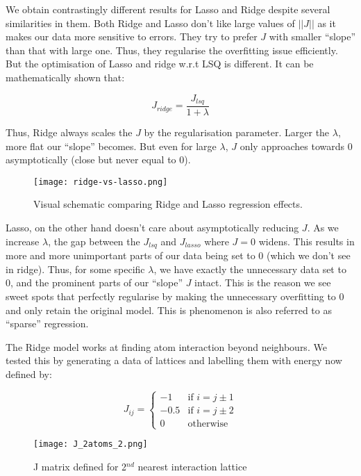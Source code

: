 We obtain contrastingly different results for Lasso and Ridge despite several similarities in them.
Both Ridge and Lasso don't like large values of \(||J||\) as it makes our data more sensitive to errors. They try to prefer $J$ with smaller ``slope'' than that with large one.
Thus, they regularise the overfitting issue efficiently.
But the optimisation of Lasso and ridge w.r.t LSQ is different.
It can be mathematically shown that:

\[J_{ridge}=\frac{J_{lsq}}{1+\lambda}\]

Thus, Ridge always scales the $J$ by the regularisation parameter.
Larger the \(\lambda\), more flat our ``slope'' becomes.
But even for large \(\lambda\), $J$ only approaches towards 0 asymptotically (close but never equal to 0).

\begin{figure}[H]
    \centering
    \texttt{[image: ridge-vs-lasso.png]}
    \caption{Visual schematic comparing Ridge and Lasso regression effects.}
\end{figure}

Lasso, on the other hand doesn't care about asymptotically reducing $J$.
As we increase \(\lambda\), the gap between the \(J_{lsq}\) and \(J_{lasso}\) where $J=0$ widens.
This results in more and more unimportant parts of our data being set to 0 (which we don't see in ridge).
Thus, for some specific \(\lambda\), we have exactly the unnecessary data set to 0, and the prominent parts of our ``slope'' $J$ intact.
This is the reason we see sweet spots that perfectly regularise by making the unnecessary overfitting to 0 and only retain the original model.
This is phenomenon is also referred to as ``sparse'' regression.

The Ridge model works at finding atom interaction beyond neighbours. We tested this by generating a data of lattices and labelling them with energy now defined by:

\begin{equation*}
    J_{ij} = \left\{
        \begin{array}{ll}
            -1 & \mbox{if } i = j \pm 1\\
            -0.5 & \mbox{if } i = j \pm 2\\
            0 & \mbox{otherwise}
        \end{array}
    \right.
\end{equation*}

\begin{figure}[H]
    \centering
    \texttt{[image: J\_2atoms\_2.png]}
    \caption{J matrix defined for 2$^{nd}$ nearest interaction lattice}
\end{figure}

